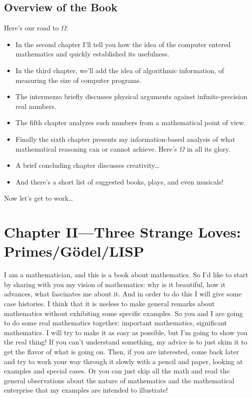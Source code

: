 \documentclass[12pt]{book}
\begin{document}
\section*{Overview of the Book}

Here's our road to $\Omega$:
\begin{itemize}
\item
In the second chapter I'll tell you how the idea of the computer entered mathematics
and quickly established its usefulness.
\item
In the third chapter, we'll add the idea of algorithmic information, of measuring
the size of computer programs.
\item
The intermezzo briefly discusses physical arguments against infinite-precision real numbers.
\item
The fifth chapter analyzes such numbers from a mathematical point of view.
\item
Finally the sixth chapter presents my information-based analysis of what mathematical
reasoning can or cannot achieve.
Here's $\Omega$ in all its glory.
\item
A brief concluding chapter discusses creativity\ldots
\item
And there's a short list of suggested books, plays, and even musicals!
\end{itemize}
Now let's get to work\ldots

\chapter*{Chapter II---Three Strange Loves: Primes/G\"odel/LISP}

I am a mathematician, and this is a book about mathematics. So I'd like to start
by sharing with you my vision of mathematics: why is it beautiful, how it advances,
what fascinates me about it. And in order to do this I will give some case histories.
I think that it is useless to make general remarks about mathematics without exhibiting
some specific examples.  So you and I are going to do some real mathematics together:
important mathematics, significant mathematics.  I will try to make it as easy as
possible, but I'm going to show you the real thing!  If you can't understand something,
my advice is to just skim it to get the flavor of what is going on.  Then, if you are
interested, come back later and try to work your way through it slowly with a pencil and paper, 
looking at examples and special cases.
Or you can just skip all the
math and read the general observations about the nature of mathematics and the
mathematical enterprise that my examples are intended to illustrate!
\end{document}
